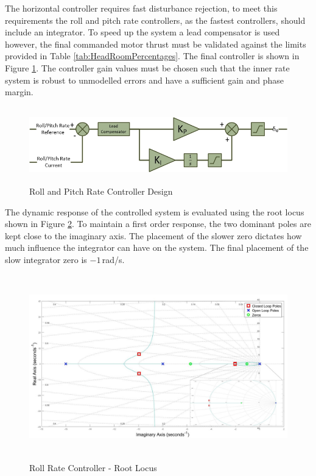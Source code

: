 	The horizontal controller requires fast disturbance rejection, to meet this requirements the roll and pitch rate controllers, as the fastest controllers, should include an integrator. To speed up the system a lead compensator is used however, the final commanded motor thrust must be validated against the limits provided in Table \ref{tab:HeadRoomPercentages}. The final controller is shown in Figure \ref{IM_RollRateController}. The controller gain values must be chosen such that the inner rate system is robust to unmodelled errors and have a sufficient gain and phase margin.
	
	\begin{figure}[H]
		\centering
		\includegraphics[height = 3.3cm]{../References/Diagrams/RollRateController.jpg}
		\caption{Roll and Pitch Rate Controller Design}
		\label{IM_RollRateController}
	\end{figure}	
	
	The dynamic response of the controlled system is evaluated using the root locus shown in Figure \ref{IM_RollRateControlRoot}. To maintain a first order response, the two dominant poles are kept close to the imaginary axis. The placement of the slower zero dictates how much influence the integrator can have on the system. The final placement of the slow integrator zero is $-1$\,rad/s.
	
	\begin{figure}[H]
		\centering
		\includegraphics[height = 8cm]{../Design/Matlab/Controllers/roll_rate_root_zoom.jpg}
		\caption{Roll Rate Controller -  Root Locus}
		\label{IM_RollRateControlRoot}
	\end{figure}
	
